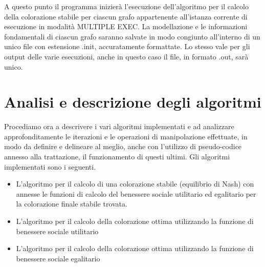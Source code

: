 A questo punto il programma inizierà l'esecuzione dell'algoritmo per il calcolo della colorazione stabile per ciascun grafo appartenente all'istanza corrente di esecuzione in modalità MULTIPLE EXEC. La modellazione e le informazioni fondamentali di ciascun grafo saranno salvate in modo congiunto all'interno di un unico file con estensione .init, accuratamente formattate. Lo stesso vale per gli output delle varie esecuzioni, anche in questo caso il file, in formato .out, sarà unico.\\

\section{Analisi e descrizione degli algoritmi}
\justify

Procediamo ora a descrivere i vari algoritmi implementati e ad analizzare approfonditamente le iterazioni e le operazioni di manipolazione effettuate, in modo da definire e delineare al meglio, anche con l'utilizzo di pseudo-codice annesso alla trattazione, il funzionamento di questi ultimi. Gli algoritmi implementati sono i seguenti.

\begin{itemize}
	\item L'algoritmo per il calcolo di una colorazione stabile (equilibrio di Nash) con annesse le funzioni di calcolo del benessere sociale utilitario ed egalitario per la colorazione finale stabile trovata.
	\item L'algoritmo per il calcolo della colorazione ottima utilizzando la funzione di benessere sociale utilitario 
	\item L'algoritmo per il calcolo della colorazione ottima utilizzando la funzione di benessere sociale egalitario 
\end{itemize}

\newpage
